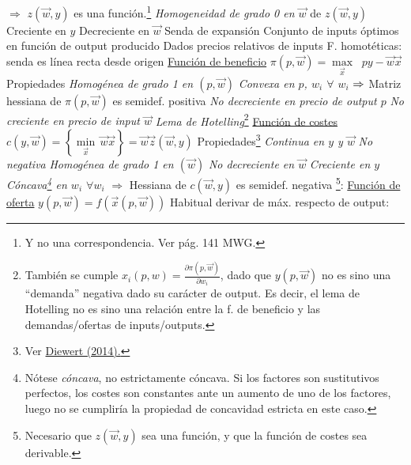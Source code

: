 \documentclass{nuevotema}
\begin{document}
\begin{esquemal}
				\4[] $\Rightarrow$ $z(\vec{w}, y)$ es una función.\footnote{Y no una correspondencia. Ver pág. 141 MWG.}
				\4[(ii)] \textit{Homogeneidad de grado 0 en $\vec{w}$} de $z(\vec{w},y)$
				\4[(iii)] Creciente en $y$
				\4[(iv)] Decreciente en $\vec{w}$
			\3 Senda de expansión
				\4 Conjunto de inputs óptimos en función de output producido
				\4[] Dados precios relativos de inputs
				\4 F. homotéticas: senda es línea recta desde origen
				\4[] 
			\3 \underline{Función de beneficio}
				\4 $ \pi(p, \vec{w}) = \underset{\vec{x}}{\max} \; \; py - \vec{w} \vec{x}$
				\4 {Propiedades}
				\4[(i)] \textit{Homogénea de grado 1 en $(p, \vec{w})$}
				\4[(ii)] \textit{Convexa en $p$, $w_i$ $\forall$ $w_i$}
				\4[] $\Rightarrow$ Matriz hessiana de $\pi(p, \vec{w})$ es semidef. positiva
				\4[(iii)] \textit{No decreciente en precio de output $p$}
				\4[(iv)] \textit{No creciente en precio de input $\vec{w}$}
				\4[(v)] \textit{Lema de Hotelling}\footnote{También se cumple $x_i (p,w) = \frac{\partial \pi (p,\vec{w})}{\partial w_i}$, dado que $y(p, \vec{w})$ no es sino una ``demanda'' negativa dado su carácter de output. Es decir, el lema de Hotelling no es sino una relación entre la f. de beneficio y las demandas/ofertas de inputs/outputs.}
				\4[] 
			\3 \underline{Función de costes}
				\4 $c(y, \vec{w}) = \left\lbrace \underset{\vec{x}}{\min} \, \vec{w} \vec{x} \right\rbrace = \vec{w} \vec{z}(\vec{w},y) $
				\4 {Propiedades}\footnote{Ver \href{https://economics.ubc.ca/files/2014/05/pdf_course_erwin-diewert-ECON594Ch3.pdf}{Diewert (2014).}}
				\4[(i)] \textit{Continua en $y$ y $\vec{w}$}
				\4[(ii)] \textit{No negativa}
				\4[(iii)] \textit{Homogénea de grado 1 en $(\vec{w})$}
				\4[(iv)] \textit{No decreciente en $\vec{w}$}
				\4[(v)] \textit{Creciente en $y$}
				\4[(vi)] \textit{Cóncava\footnote{Nótese \textit{cóncava}, no estrictamente cóncava. Si los factores son sustitutivos perfectos, los costes son constantes ante un aumento de uno de los factores, luego no se cumpliría la propiedad de concavidad estricta en este caso.} en $w_i$ $\forall w_i$}
				\4[] $\Rightarrow$ Hessiana de $c(\vec{w}, y)$ es semidef. negativa
				\4[(vii)] \footnote{Necesario que $z(\vec{w},y)$ sea una función, y que la función de costes sea derivable.}:
				\4[] 
			\3 \underline{Función de oferta}
				\4 $y(p, \vec{w}) = f(\vec{x}(p, \vec{w}))$
				\4 Habitual derivar de máx. respecto de output:

\end{esquemal}
\end{document}

